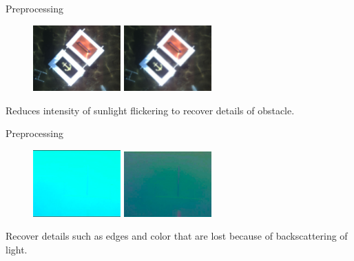 \documentclass{beamer}
\begin{document}
\begin{frame}{Preprocessing}
    \begin{figure}[ht]
        \centering
        \includegraphics[width=0.3\textwidth, height=0.3\textheight]{figs/robosub16_bin_flicker_shadow.png}\hspace{5em}
        \includegraphics[width=0.3\textwidth, height=0.3\textheight]{figs/robosub16_bin_flicker_shadow_homomorphic_filter.png}
    \end{figure}
    Reduces intensity of sunlight flickering to recover details of obstacle.
\end{frame}

\begin{frame}{Preprocessing}
    \begin{figure}[ht]
        \centering
        \includegraphics[width=0.3\textwidth, height=0.3\textheight]{figs/pole_blur.png}\hspace{5em}
        \includegraphics[width=0.3\textwidth, height=0.3\textheight]{figs/pole_enhance.png}
    \end{figure}
    Recover details such as edges and color that are lost because of backscattering of light.
\end{frame}
\end{document}
